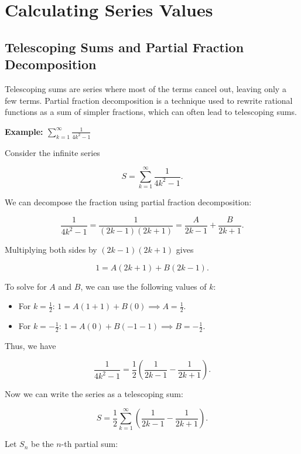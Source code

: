 \newpage
\section{Calculating Series Values}

\subsection{Telescoping Sums and Partial Fraction Decomposition}

Telescoping sums are series where most of the terms cancel out, leaving only a few terms. Partial fraction decomposition is a technique used to rewrite rational functions as a sum of simpler fractions, which can often lead to telescoping sums.

\textbf{Example: \(\sum_{k=1}^{\infty} \frac{1}{4k^2 - 1}\)}

Consider the infinite series

\[
    S = \sum_{k=1}^{\infty} \frac{1}{4k^2 - 1}.
\]

We can decompose the fraction using partial fraction decomposition:

\[
    \frac{1}{4k^2 - 1} = \frac{1}{(2k - 1)(2k + 1)} = \frac{A}{2k - 1} + \frac{B}{2k + 1}.
\]

Multiplying both sides by \((2k - 1)(2k + 1)\) gives

\[
    1 = A(2k + 1) + B(2k - 1).
\]

To solve for \(A\) and \(B\), we can use the following values of \(k\):

\begin{itemize}

    \item For \(k = \frac{1}{2}\): \(1 = A(1 + 1) + B(0) \implies A = \frac{1}{2}\).

    \item For \(k = -\frac{1}{2}\): \(1 = A(0) + B(-1 - 1) \implies B = -\frac{1}{2}\).

\end{itemize}

Thus, we have

\[
    \frac{1}{4k^2 - 1} = \frac{1}{2} \left( \frac{1}{2k - 1} - \frac{1}{2k + 1} \right).
\]

Now we can write the series as a telescoping sum:

\[
    S = \frac{1}{2} \sum_{k=1}^{\infty} \left( \frac{1}{2k - 1} - \frac{1}{2k + 1} \right).
\]

Let \(S_n\) be the \(n\)-th partial sum:

